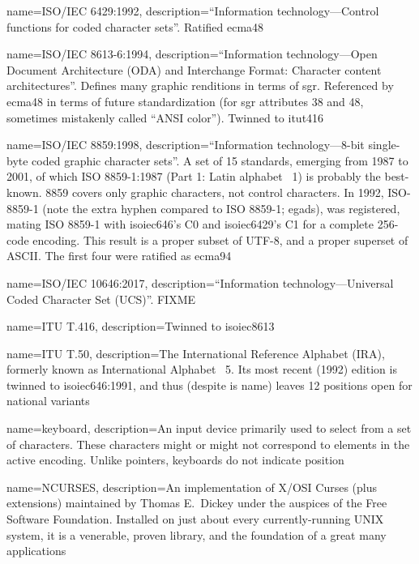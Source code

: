 {
  name={ISO/IEC 6429:1992},
  description={``Information technology---Control functions for coded character sets''.
   Ratified \Gls{ecma48}}
}

{
  name={ISO/IEC 8613-6:1994},
  description={``Information technology---Open Document Architecture (ODA) and Interchange Format: Character content architectures''.
    Defines many graphic renditions in terms of \Gls{sgr}. Referenced by \Gls{ecma48} in terms
    of future standardization (for \Gls{sgr} attributes 38 and 48, sometimes
    mistakenly called ``ANSI color''). Twinned to \Gls{itut416}}
}

{
  name={ISO/IEC 8859:1998},
  description={``Information technology---8-bit single-byte coded graphic character sets''.
    A set of 15 standards, emerging from 1987 to 2001, of which ISO 8859-1:1987 (Part 1: Latin alphabet \textnumero\ 1) is
    probably the best-known. 8859 covers only graphic characters, not control
    characters. In 1992, ISO-8859-1 (note the extra hyphen compared to ISO 8859-1; egads),
    was registered, mating ISO 8859-1 with \Gls{isoiec646}'s C0 and
    \Gls{isoiec6429}'s C1 for a complete 256-code encoding. This result is a
    proper subset of UTF-8, and a proper superset of ASCII. The first four were
    ratified as \Gls{ecma94}}
}

{
  name={ISO/IEC 10646:2017},
  description={``Information technology---Universal Coded Character Set (UCS)''.
    FIXME
    }
}

{
  name={ITU T.416},
  description={Twinned to \Gls{isoiec8613}}
}

{
  name={ITU T.50},
  description={The International Reference Alphabet (IRA), formerly known as
   International Alphabet \textnumero\ 5. Its most recent (1992)
   edition is twinned to \Gls{isoiec646}:1991, and thus (despite is name)
   leaves 12 positions open for national variants}
}

{
  name={keyboard},
  description={An input device primarily used to select from a set of
  characters. These characters might or might not correspond to elements in
  the active encoding. Unlike pointers, keyboards do not indicate position}
}

{
  name={NCURSES},
description={An implementation of X/OSI Curses (plus extensions) maintained by
  Thomas E.\ Dickey under the auspices of the Free Software Foundation.
  Installed on just about every currently-running UNIX system, it is a
  venerable, proven library, and the foundation of a great many applications}
}

